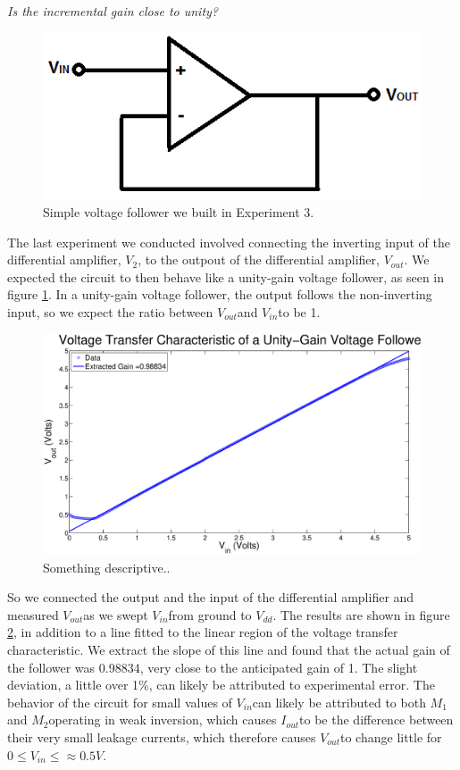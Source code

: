 \documentclass{article}
\newcommand{\Vout}{{$V_{out}$}}
\newcommand{\Vtwo}{{$V_{2}$}}
\newcommand{\Vdd}{{$V_{dd}$}}
\newcommand{\Iout}{{$I_{out}$}}
\newcommand{\Vin}{{$V_{in}$}}
\newcommand{\Mone}{{$M_{1}$}}
\newcommand{\Mtwo}{{$M_{2}$}}
\begin{document}
\textit{Is the incremental gain close to unity?}

\begin{figure}[H]
\centering
\includegraphics[width=0.5\linewidth]{../Figures/Voltage-follower}
\caption{Simple voltage follower we built in Experiment 3.}
\label{fig:voltagefollow}
\end{figure}

The last experiment we conducted involved connecting the inverting input of the differential amplifier, \Vtwo, to the outpout of the differential amplifier, \Vout. We expected the circuit to then behave like a unity-gain voltage follower, as seen in figure \ref{fig:voltagefollow}. In a unity-gain voltage follower, the output follows the non-inverting input, so we expect the ratio between \Vout and \Vin to be 1.

\begin{figure}[H]
\centering
\includegraphics[width=\linewidth]{../Figures/Exp3P1.eps}
\caption{Something descriptive..}
\label{fig:exp3p1}
\end{figure}

So we connected the output and the input of the differential amplifier and measured \Vout as we swept \Vin from ground to \Vdd. The results are shown in figure \ref{fig:exp3p1}, in addition to a line fitted to the linear region of the voltage transfer characteristic. We extract the slope of this line and found that the actual gain of the follower was 0.98834, very close to the anticipated gain of 1. The slight deviation, a little over 1\%, can likely be attributed to experimental error. The behavior of the circuit for small values of \Vin can likely be attributed to both \Mone and \Mtwo operating in weak inversion, which causes \Iout to be the difference between their very small leakage currents, which therefore causes \Vout to change little for $0 \leq V_{in} \leq \approx 0.5 V.$
\end{document}
